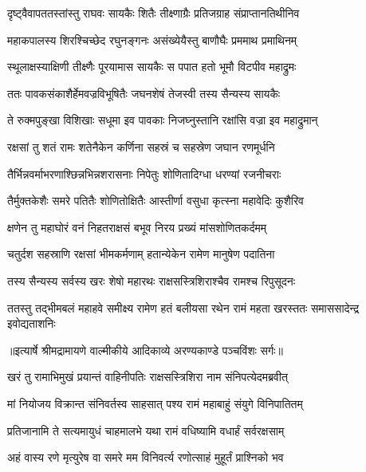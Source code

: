 \twolineshloka
{दृष्ट्वैवापततस्तांस्तु राघवः सायकैः शितैः}
{तीक्ष्णाग्रैः प्रतिजग्राह संप्राप्तानतिथीनिव} %

\twolineshloka
{महाकपालस्य शिरश्चिच्छेद रघुनङ्गनः}
{असंख्येयैस्तु बाणौघैः प्रममाथ प्रमाथिनम्} %

\twolineshloka
{स्थूलाक्षस्याक्षिणी तीक्ष्णैः पूरयामास सायकैः}
{स पपात हतो भूमौ विटपीव महाद्रुमः} %

\twolineshloka
{ततः पावकसंकाशैर्हेमवज्रविभूषितैः}
{जघनशेषं तेजस्वी तस्य सैन्यस्य सायकैः} %

\twolineshloka
{ते रुक्मपुङ्खा विशिखाः सधूमा इव पावकाः}
{निजघ्नुस्तानि रक्षांसि वज्रा इव महाद्रुमान्} %

\twolineshloka
{रक्षसां तु शतं रामः शतेनैकेन कर्णिना}
{सहस्रं च सहस्रेण जघान रणमूर्धनि} %

\twolineshloka
{तैर्भिन्नवर्माभरणाश्छिन्नभिन्नशरासनाः}
{निपेतुः शोणितादिग्धा धरण्यां रजनीचराः} %

\twolineshloka
{तैर्मुक्तकेशैः समरे पतितैः शोणितोक्षितैः}
{आस्तीर्णा वसुधा कृत्स्ना महावेदिः कुशैरिव} %

\twolineshloka
{क्षणेन तु महाघोरं वनं निहतराक्षसं}
{बभूव निरय प्रख्यं मांसशोणितकर्दमम्} %

\twolineshloka
{चतुर्दश सहस्राणि रक्षसां भीमकर्मणाम्}
{हतान्येकेन रामेण मानुषेण पदातिना} %

\twolineshloka
{तस्य सैन्यस्य सर्वस्य खरः शेषो महारथः}
{राक्षसस्त्रिशिराश्चैव रामश्च रिपुसूदनः} %

\fourlineindentedshloka
{ततस्तु तद्भीमबलं महाहवे}
{ समीक्ष्य रामेण हतं बलीयसा}
{रथेन रामं महता खरस्ततः}
{ समाससादेन्द्र इवोद्यताशनिः} %


{॥इत्यार्षे श्रीमद्रामायणे वाल्मीकीये आदिकाव्ये अरण्यकाण्डे पञ्चविंशः सर्गः॥}


\twolineshloka
{खरं तु रामाभिमुखं प्रयान्तं वाहिनीपतिः}
{राक्षसस्त्रिशिरा नाम संनिपत्येदमब्रवीत्} %

\twolineshloka
{मां नियोजय विक्रान्त संनिवर्तस्व साहसात्}
{पश्य रामं महाबाहुं संयुगे विनिपातितम्} %

\twolineshloka
{प्रतिजानामि ते सत्यमायुधं चाहमालभे}
{यथा रामं वधिष्यामि वधार्हं सर्वरक्षसाम्} %

\twolineshloka
{अहं वास्य रणे मृत्युरेष वा समरे मम}
{विनिवर्त्य रणोत्साहं मुहूर्तं प्राश्निको भव} %

